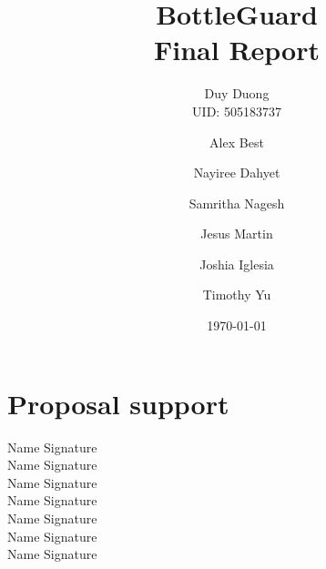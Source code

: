\documentclass[12pt]{article}
\begin{document}
	\title{BottleGuard\\Final Report}
	\author{Duy Duong\\UID: 505183737 \and Alex Best \and Nayiree Dahyet \and Samritha Nagesh \and Jesus Martin \and Joshia Iglesia \and Timothy Yu}
	\date{\today}
	\maketitle

	
	\section*{Proposal support}
	\begin{center}
			Name \underline{\hspace{8cm}}
		Signature \underline{\hspace{3cm}}\\ \vspace{5mm}
		Name \underline{\hspace{8cm}}
		Signature \underline{\hspace{3cm}}\\  \vspace{5mm}
		Name \underline{\hspace{8cm}}
		Signature \underline{\hspace{3cm}}\\  \vspace{5mm}
		Name \underline{\hspace{8cm}}
		Signature \underline{\hspace{3cm}}\\  \vspace{5mm}
		Name \underline{\hspace{8cm}}
		Signature \underline{\hspace{3cm}}\\  \vspace{5mm}
		Name \underline{\hspace{8cm}}
		Signature \underline{\hspace{3cm}}\\  \vspace{5mm}
		Name \underline{\hspace{8cm}}
		Signature \underline{\hspace{3cm}}\\  \vspace{5mm}
	\end{center}

\pagebreak
	\renewcommand*\contentsname{Table of Contents}
	\tableofcontents
		\vspace{10mm}
		
\end{document}

